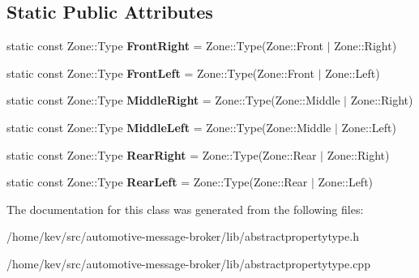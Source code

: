\subsection*{Static Public Attributes}
\begin{DoxyCompactItemize}
\item 
\hypertarget{classZone_a37315b6f9837e00447422775a96a20ca}{static const Zone\+::\+Type {\bfseries Front\+Right} = Zone\+::\+Type(Zone\+::\+Front $\vert$ Zone\+::\+Right)}\label{classZone_a37315b6f9837e00447422775a96a20ca}

\item 
\hypertarget{classZone_a6a87ff703e79adeb7c1d625565b19465}{static const Zone\+::\+Type {\bfseries Front\+Left} = Zone\+::\+Type(Zone\+::\+Front $\vert$ Zone\+::\+Left)}\label{classZone_a6a87ff703e79adeb7c1d625565b19465}

\item 
\hypertarget{classZone_a1d569d1d452b7c9201572882076afff0}{static const Zone\+::\+Type {\bfseries Middle\+Right} = Zone\+::\+Type(Zone\+::\+Middle $\vert$ Zone\+::\+Right)}\label{classZone_a1d569d1d452b7c9201572882076afff0}

\item 
\hypertarget{classZone_a750a3ead97ed9634c09e2cd581052be2}{static const Zone\+::\+Type {\bfseries Middle\+Left} = Zone\+::\+Type(Zone\+::\+Middle $\vert$ Zone\+::\+Left)}\label{classZone_a750a3ead97ed9634c09e2cd581052be2}

\item 
\hypertarget{classZone_a0e756f33e1f50c13ee13fe46027a1359}{static const Zone\+::\+Type {\bfseries Rear\+Right} = Zone\+::\+Type(Zone\+::\+Rear $\vert$ Zone\+::\+Right)}\label{classZone_a0e756f33e1f50c13ee13fe46027a1359}

\item 
\hypertarget{classZone_a7c83e580e0478be716f344eb56a041e3}{static const Zone\+::\+Type {\bfseries Rear\+Left} = Zone\+::\+Type(Zone\+::\+Rear $\vert$ Zone\+::\+Left)}\label{classZone_a7c83e580e0478be716f344eb56a041e3}

\end{DoxyCompactItemize}


The documentation for this class was generated from the following files\+:\begin{DoxyCompactItemize}
\item 
/home/kev/src/automotive-\/message-\/broker/lib/abstractpropertytype.\+h\item 
/home/kev/src/automotive-\/message-\/broker/lib/abstractpropertytype.\+cpp\end{DoxyCompactItemize}
